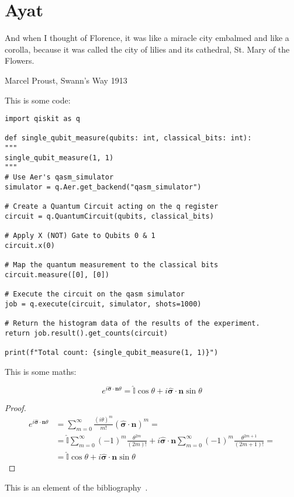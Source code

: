 \section{Ayat}
\epigraph{And when I thought of Florence, it was like a miracle city embalmed and like a corolla, because it was called the city of lilies and its cathedral, St. Mary of the Flowers.}{Marcel Proust, Swann's Way 1913}



This is some code:
\begin{verbatim}
import qiskit as q

def single_qubit_measure(qubits: int, classical_bits: int):
"""
single_qubit_measure(1, 1)
"""
# Use Aer's qasm_simulator
simulator = q.Aer.get_backend("qasm_simulator")

# Create a Quantum Circuit acting on the q register
circuit = q.QuantumCircuit(qubits, classical_bits)

# Apply X (NOT) Gate to Qubits 0 & 1
circuit.x(0)

# Map the quantum measurement to the classical bits
circuit.measure([0], [0])

# Execute the circuit on the qasm simulator
job = q.execute(circuit, simulator, shots=1000)

# Return the histogram data of the results of the experiment.
return job.result().get_counts(circuit)

print(f"Total count: {single_qubit_measure(1, 1)}")
\end{verbatim}
This is some maths:


\begin{theorem}
\begin{equation*}
e^{i\hat{\boldsymbol{\sigma}} \cdot \mathbf{n}\theta} = \hat{\mathbb{I}}\cos\theta + i\hat{\boldsymbol{\sigma}} \cdot \mathbf{n} \sin\theta
\end{equation*}
\end{theorem}
\begin{proof}
\begin{equation*}
\begin{split}
    e^{i\hat{\boldsymbol{\sigma}} \cdot \mathbf{n}\theta} &=  \sum_{m=0}^\infty \frac{(i\theta)^m}{m!} (\hat{\boldsymbol{\sigma}} \cdot \mathbf{n} )^m = \\
    &= \hat{\mathbb{I}} \sum_{m=0}^\infty (-1)^m \frac{\theta^{2m}}{(2m)!}  + i\hat{\boldsymbol{\sigma}} \cdot \mathbf{n} \sum_{m=0}^\infty (-1)^m \frac{\theta^{2m+1}}{(2m+1)!} = \\
    &= \hat{\mathbb{I}}\cos\theta + i\hat{\boldsymbol{\sigma}} \cdot \mathbf{n} \sin\theta
\end{split}
\end{equation*}
\end{proof}

This is an element of the bibliography~\cite{2022}.
